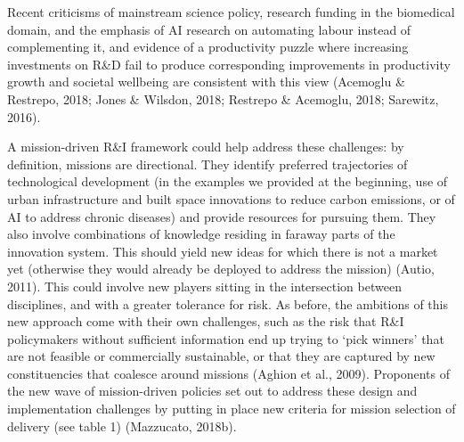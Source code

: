 \documentclass[11pt]{article}
\begin{document}
Recent criticisms of mainstream science policy, research funding in the biomedical domain, and the emphasis of AI research on automating labour instead of complementing it, and evidence of a productivity puzzle where increasing investments on R\&D fail to produce corresponding improvements in productivity growth and societal well\-being are consistent with this view (Acemoglu \& Restrepo, 2018; Jones & Wilsdon, 2018; Restrepo & Acemoglu, 2018; Sarewitz, 2016).

A mission-driven R&I framework could help address these challenges: by definition, missions are directional. They identify preferred trajectories of technological development (in the examples we provided at the beginning, use of urban infrastructure and built space innovations to reduce carbon emissions, or of AI to address chronic diseases) and provide resources for pursuing them. They also involve combinations of knowledge residing in faraway parts of the innovation system. This should yield new ideas for which there is not a market yet (otherwise they would already be deployed to address the mission) (Autio, 2011). This could involve new players sitting in the intersection between disciplines, and with a greater tolerance for risk. As before, the ambitions of this new approach come with their own challenges, such as the risk that R\&I policymakers without sufficient information end up trying to `pick winners’ that are not feasible or commercially sustainable, or that they are captured
by new constituencies that coalesce around missions (Aghion et al., 2009). Proponents of the new wave of mission-driven policies set out to address these design and implementation challenges by putting in place new criteria for mission selection of delivery (see table 1) (Mazzucato, 2018b).
\end{document}
